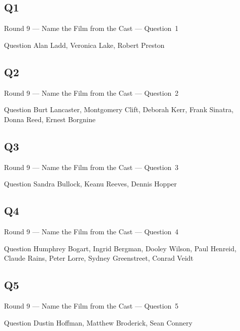 \documentclass[11pt]{beamer}
\begin{document}
\subsection*{Q1}
\begin{frame}[t]{Round 9 --- Name the Film from the Cast --- \mbox{Question 1}}
\vspace{-0.5em}
\begin{block}{Question}
Alan Ladd, Veronica Lake, Robert Preston
\end{block}
\end{frame}
\subsection*{Q2}
\begin{frame}[t]{Round 9 --- Name the Film from the Cast --- \mbox{Question 2}}
\vspace{-0.5em}
\begin{block}{Question}
Burt Lancaster, Montgomery Clift, Deborah Kerr, Frank Sinatra, Donna Reed, Ernest Borgnine
\end{block}
\end{frame}
\subsection*{Q3}
\begin{frame}[t]{Round 9 --- Name the Film from the Cast --- \mbox{Question 3}}
\vspace{-0.5em}
\begin{block}{Question}
Sandra Bullock, Keanu Reeves, Dennis Hopper
\end{block}
\end{frame}
\subsection*{Q4}
\begin{frame}[t]{Round 9 --- Name the Film from the Cast --- \mbox{Question 4}}
\vspace{-0.5em}
\begin{block}{Question}
Humphrey Bogart, Ingrid Bergman, Dooley Wilson, Paul Henreid, Claude Rains, Peter Lorre, Sydney Greenstreet, Conrad Veidt
\end{block}
\end{frame}
\subsection*{Q5}
\begin{frame}[t]{Round 9 --- Name the Film from the Cast --- \mbox{Question 5}}
\vspace{-0.5em}
\begin{block}{Question}
Dustin Hoffman, Matthew Broderick, Sean Connery
\end{block}
\end{frame}
\end{document}
